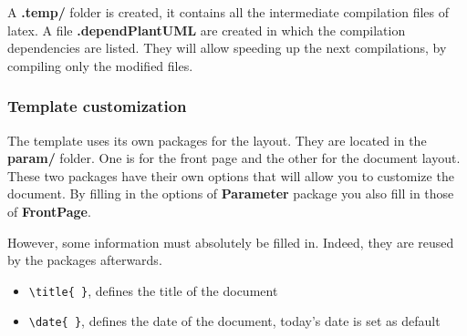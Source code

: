 A \textbf{.temp/} folder is created, it contains all the intermediate compilation files of
\gls{latex}.
A file \textbf{.dependPlantUML} are created in which the compilation dependencies are listed.
They will allow speeding up the next compilations, by compiling only the modified files.

\subsubsection{Template customization} \label{customization}
The template uses its own packages for the layout.
They are located in the \textbf{param/} folder.
One is for the front page and the other for the document layout. These two packages have their own
options that will allow you to customize the document.
By filling in the options of \textbf{Parameter} package you also fill in those of
\textbf{FrontPage}. \newline

However, some information must absolutely be filled in. Indeed, they are reused by the packages
afterwards.
\begin{itemize}
    \item \verb=\title{ }=, defines the title of the document
    \item \verb=\date{ }=, defines the date of the document, today's date is set as default\newline
\end{itemize}

